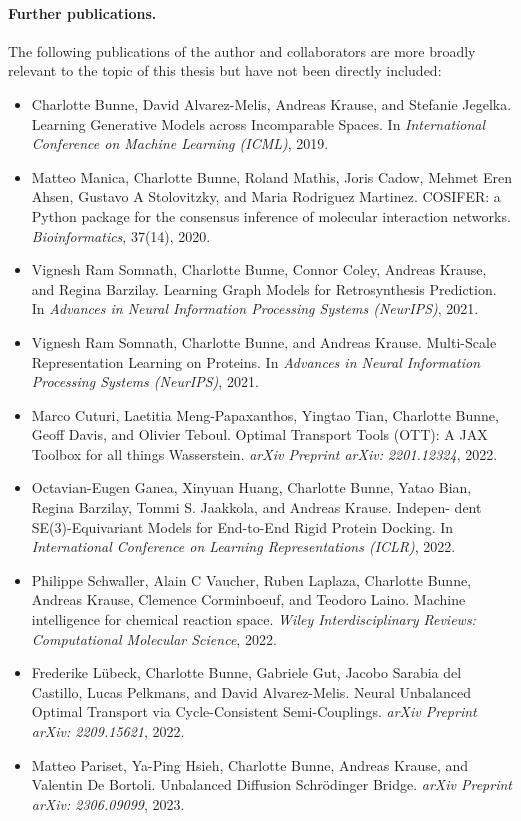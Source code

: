 \paragraph{Further publications.}
The following publications of the author and collaborators are more broadly relevant to the topic of this thesis but have not been directly included:

\begin{itemize}
	\item[] Charlotte Bunne, David Alvarez-Melis, Andreas Krause, and Stefanie Jegelka. Learning Generative Models across Incomparable Spaces. In \textit{International Conference on Machine Learning (ICML)}, 2019.
	\item[] Matteo Manica, Charlotte Bunne, Roland Mathis, Joris Cadow, Mehmet Eren Ahsen, Gustavo A Stolovitzky, and Maria Rodriguez Martinez. COSIFER: a Python package for the consensus inference of molecular interaction networks. \textit{Bioinformatics}, 37(14), 2020.
	\item[] Vignesh Ram Somnath, Charlotte Bunne, Connor Coley, Andreas Krause, and Regina Barzilay. Learning Graph Models for Retrosynthesis Prediction. In \textit{Advances in Neural Information Processing Systems (NeurIPS)}, 2021.
	\item[] Vignesh Ram Somnath, Charlotte Bunne, and Andreas Krause. Multi-Scale Representation Learning on Proteins. In \textit{Advances in Neural Information Processing Systems (NeurIPS)}, 2021.
	\item[] Marco Cuturi, Laetitia Meng-Papaxanthos, Yingtao Tian, Charlotte Bunne, Geoff Davis, and Olivier Teboul. Optimal Transport Tools (OTT): A JAX Toolbox for all things Wasserstein. \textit{arXiv Preprint arXiv: 2201.12324}, 2022.
	\item[] Octavian-Eugen Ganea, Xinyuan Huang, Charlotte Bunne, Yatao Bian, Regina Barzilay, Tommi S. Jaakkola, and Andreas Krause. Indepen- dent SE(3)-Equivariant Models for End-to-End Rigid Protein Docking. In \textit{International Conference on Learning Representations (ICLR)}, 2022.
	\item[] Philippe Schwaller, Alain C Vaucher, Ruben Laplaza, Charlotte Bunne, Andreas Krause, Clemence Corminboeuf, and Teodoro Laino. Machine intelligence for chemical reaction space. \textit{Wiley Interdisciplinary Reviews: Computational Molecular Science}, 2022.
	\item[] Frederike L\"ubeck, Charlotte Bunne, Gabriele Gut, Jacobo Sarabia del Castillo, Lucas Pelkmans, and David Alvarez-Melis. Neural Unbalanced Optimal Transport via Cycle-Consistent Semi-Couplings. \textit{arXiv Preprint arXiv: 2209.15621}, 2022.
	\item[] Matteo Pariset, Ya-Ping Hsieh, Charlotte Bunne, Andreas Krause, and Valentin De Bortoli. Unbalanced Diffusion Schr{\"o}dinger Bridge. \textit{arXiv Preprint arXiv: 2306.09099}, 2023.
\end{itemize}

